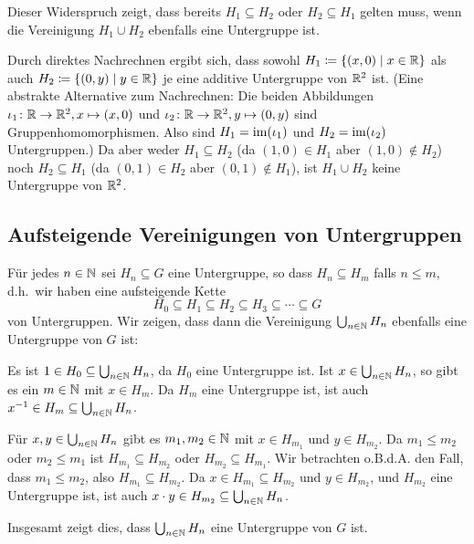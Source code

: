 Dieser Widerspruch zeigt, dass bereits $H_1 \subseteq H_2$ oder $H_2 \subseteq H_1$ gelten muss, wenn die Vereinigung $H_1 \cup H_2$ ebenfalls eine Untergruppe ist.

\begin{bsp}
 Durch direktes Nachrechnen ergibt sich, dass sowohl $H_1 \coloneqq \{(x, 0) \mid x \in \mathbb{R}\}$ als auch $H_2 \coloneqq \{(0,y) \mid y \in \mathbb{R}\}$ je eine additive Untergruppe von $\mathbb{R}^2$ ist. (Eine abstrakte Alternative zum Nachrechnen: Die beiden Abbildungen $\iota_1 \colon \mathbb{R} \to \mathbb{R}^2, x \mapsto (x,0)$ und $\iota_2 \colon \mathbb{R} \to \mathbb{R}^2, y \mapsto (0,y)$ sind Gruppenhomomorphismen. Also sind $H_1 = \mathrm{im}(\iota_1)$ und $H_2 = \mathrm{im}(\iota_2)$ Untergruppen.) Da aber weder $H_1 \subseteq H_2$ (da $(1,0) \in H_1$ aber $(1,0) \notin H_2$) noch $H_2 \subseteq H_1$ (da $(0,1) \in H_2$ aber $(0,1) \notin H_1$), ist $H_1 \cup H_2$ keine Untergruppe von $\mathbb{R}^2$.
\end{bsp}


\subsection{Aufsteigende Vereinigungen von Untergruppen}
Für jedes $n \in \mathbb{N}$ sei $H_n \subseteq G$ eine Untergruppe, so dass $H_n \subseteq H_m$ falls $n \leq m$, d.h.\ wir haben eine aufsteigende Kette
\[
 H_0 \subseteq H_1 \subseteq H_2 \subseteq H_3 \subseteq \dotsb \subseteq G
\]
von Untergruppen. Wir zeigen, dass dann die Vereinigung $\bigcup_{n \in \mathbb{N}} H_n$ ebenfalls eine Untergruppe von $G$ ist:

Es ist $1 \in H_0 \subseteq \bigcup_{n \in \mathbb{N}} H_n$, da $H_0$ eine Untergruppe ist. Ist $x \in \bigcup_{n \in \mathbb{N}} H_n$, so gibt es ein $m \in \mathbb{N}$ mit $x \in H_m$. Da $H_m$ eine Untergruppe ist, ist auch $x^{-1} \in H_m \subseteq \bigcup_{n \in \mathbb{N}} H_n$.

Für $x,y \in \bigcup_{n \in \mathbb{N}} H_n$ gibt es $m_1, m_2 \in \mathbb{N}$ mit $x \in H_{m_1}$ und $y \in H_{m_2}$. Da $m_1 \leq m_2$ oder $m_2 \leq m_1$ ist $H_{m_1} \subseteq H_{m_2}$ oder $H_{m_2} \subseteq H_{m_1}$. Wir betrachten o.B.d.A. den Fall, dass $m_1 \leq m_2$, also $H_{m_1} \subseteq H_{m_2}$. Da $x \in H_{m_1} \subseteq H_{m_2}$ und $y \in H_{m_2}$, und $H_{m_2}$ eine Untergruppe ist, ist auch $x \cdot y \in H_{m_2} \subseteq \bigcup_{n \in \mathbb{N}} H_n$.

Insgesamt zeigt dies, dass $\bigcup_{n \in \mathbb{N}} H_n$ eine Untergruppe von $G$ ist.

